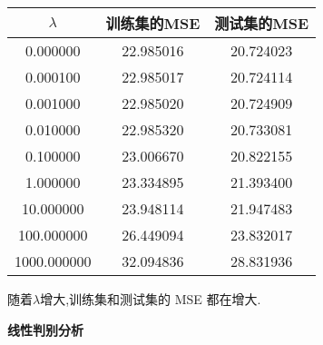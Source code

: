 \documentclass[answers]{exam}  %
\begin{document}
\begin{questions}
\begin{solution}
\begin{enumerate}
			      \begin{center}
				      \begin{tabular}{|c|c|c|}
					      \hline
					      $\lambda$   & 训练集的MSE & 测试集的MSE \\
					      \hline
					      0.000000    & 22.985016   & 20.724023   \\
					      \hline
					      0.000100    & 22.985017   & 20.724114   \\
					      \hline
					      0.001000    & 22.985020   & 20.724909   \\
					      \hline
					      0.010000    & 22.985320   & 20.733081   \\
					      \hline
					      0.100000    & 23.006670   & 20.822155   \\
					      \hline
					      1.000000    & 23.334895   & 21.393400   \\
					      \hline
					      10.000000   & 23.948114   & 21.947483   \\
					      \hline
					      100.000000  & 26.449094   & 23.832017   \\
					      \hline
					      1000.000000 & 32.094836   & 28.831936   \\
					      \hline
				      \end{tabular}
			      \end{center}

			      随着$\lambda$增大,训练集和测试集的 MSE 都在增大.
		\end{enumerate}
	\end{solution}

	\question [20] \textbf{线性判别分析}


\end{questions}
\end{document}

